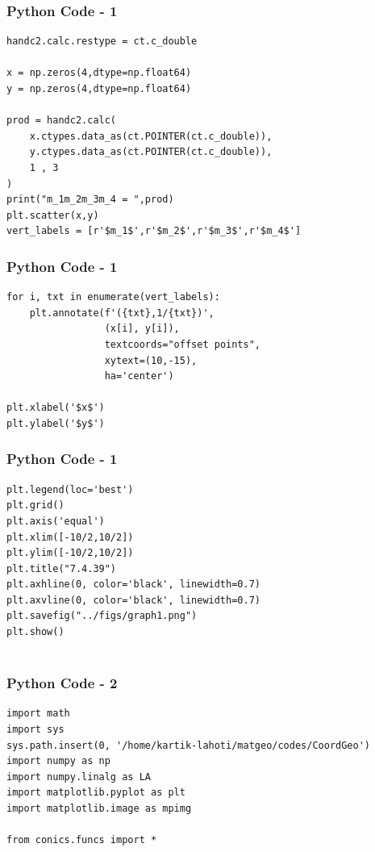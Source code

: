 \documentclass{beamer}
\begin{document}
\begin{frame}[fragile]
    \frametitle{Python Code - 1}
    \begin{lstlisting}
handc2.calc.restype = ct.c_double

x = np.zeros(4,dtype=np.float64)
y = np.zeros(4,dtype=np.float64)

prod = handc2.calc(
    x.ctypes.data_as(ct.POINTER(ct.c_double)),
    y.ctypes.data_as(ct.POINTER(ct.c_double)),
    1 , 3
)
print("m_1m_2m_3m_4 = ",prod)
plt.scatter(x,y)
vert_labels = [r'$m_1$',r'$m_2$',r'$m_3$',r'$m_4$']

\end{lstlisting}
\end{frame}

\begin{frame}[fragile]
    \frametitle{Python Code - 1}
    \begin{lstlisting}
for i, txt in enumerate(vert_labels):
    plt.annotate(f'({txt},1/{txt})',
                 (x[i], y[i]),
                 textcoords="offset points",
                 xytext=(10,-15),
                 ha='center')

plt.xlabel('$x$')
plt.ylabel('$y$')
\end{lstlisting}
\end{frame}


\begin{frame}[fragile]
    \frametitle{Python Code - 1}
    \begin{lstlisting}
plt.legend(loc='best')
plt.grid() 
plt.axis('equal')
plt.xlim([-10/2,10/2])
plt.ylim([-10/2,10/2])
plt.title("7.4.39")
plt.axhline(0, color='black', linewidth=0.7)
plt.axvline(0, color='black', linewidth=0.7)
plt.savefig("../figs/graph1.png")
plt.show()


\end{lstlisting}
\end{frame}

\begin{frame}[fragile]
    \frametitle{Python Code - 2}
    \begin{lstlisting}
import math
import sys
sys.path.insert(0, '/home/kartik-lahoti/matgeo/codes/CoordGeo')
import numpy as np
import numpy.linalg as LA
import matplotlib.pyplot as plt
import matplotlib.image as mpimg

from conics.funcs import *
\end{lstlisting}
\end{frame}
\end{document}

